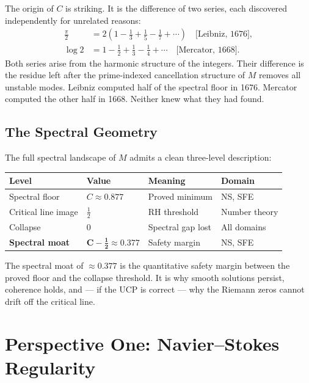 \documentclass[12pt]{article}
\begin{document}
The origin of $C$ is striking. It is the difference of two
series, each discovered independently for unrelated reasons:
\begin{align}
\frac{\pi}{2}
&= 2\!\left(1 - \frac{1}{3} + \frac{1}{5} - \frac{1}{7} + \cdots\right)
\quad \text{[Leibniz, 1676]},
\label{eq:leibniz}\\[4pt]
\log 2
&= 1 - \frac{1}{2} + \frac{1}{3} - \frac{1}{4} + \cdots
\quad \text{[Mercator, 1668]}.
\label{eq:mercator}
\end{align}
Both series arise from the harmonic structure of the integers.
Their difference is the residue left after the prime-indexed
cancellation structure of $M$ removes all unstable modes.
Leibniz computed half of the spectral floor in 1676. Mercator
computed the other half in 1668. Neither knew what they had found.

\subsection{The Spectral Geometry}

The full spectral landscape of $M$ admits a clean three-level
description:

\begin{center}
\renewcommand{\arraystretch}{1.4}
\begin{tabular}{llll}
\toprule
Level & Value & Meaning & Domain \\
\midrule
Spectral floor & $C \approx 0.877$ & Proved minimum & NS, SFE \\
Critical line image & $\tfrac{1}{2}$ & RH threshold & Number theory \\
Collapse & $0$ & Spectral gap lost & All domains \\
\midrule
\textbf{Spectral moat} & $\mathbf{C - \tfrac{1}{2} \approx 0.377}$
& Safety margin & NS, SFE \\
\bottomrule
\end{tabular}
\end{center}

\noindent
The spectral moat of $\approx 0.377$ is the quantitative safety
margin between the proved floor and the collapse threshold.
It is why smooth solutions persist, coherence holds, and ---
if the UCP is correct --- why the Riemann zeros cannot drift
off the critical line.

\section{Perspective One: Navier--Stokes Regularity}
\end{document}
